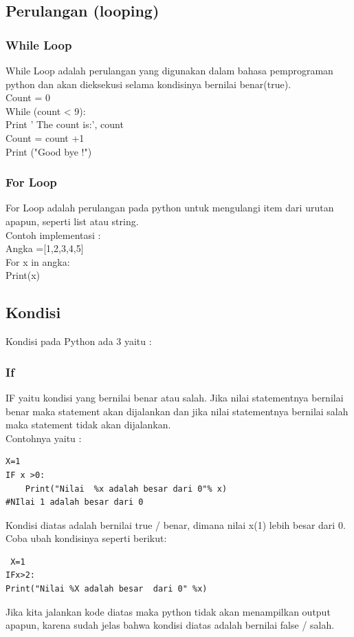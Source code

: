 \documentclass[12pt, times new roman, a4paper]{article}
\begin{document}
\subsection{Perulangan (looping)}
\subsubsection{ While Loop}
While Loop adalah perulangan yang digunakan dalam bahasa pemprograman python dan akan dieksekusi selama kondisinya bernilai benar(true).\\
Count = 0\\
While (count < 9):\\
Print ’ The count is:’, count\\
Count = count +1\\
Print ("Good bye !")\\
\subsubsection{For Loop}
For Loop adalah perulangan pada python untuk mengulangi item dari
urutan apapun, seperti list atau string.\\
Contoh implementasi :\\
Angka =[1,2,3,4,5]\\
For x in angka:\\
Print(x)\\

\subsection{Kondisi}
Kondisi pada Python ada 3 yaitu :\\
\subsubsection{If}
IF yaitu kondisi yang bernilai benar atau salah. Jika nilai statementnya
bernilai benar maka statement akan dijalankan dan jika nilai statementnya
bernilai salah maka statement tidak akan dijalankan.\\
Contohnya yaitu :
\begin{verbatim}
X=1
IF x >0:
	Print("Nilai  %x adalah besar dari 0"% x)
#NIlai 1 adalah besar dari 0
\end{verbatim}
Kondisi diatas adalah bernilai true / benar, dimana nilai x(1) lebih besar
dari 0. Coba ubah kondisinya seperti berikut:
\begin{verbatim}
 X=1
IFx>2:
Print("Nilai %X adalah besar  dari 0" %x)
\end{verbatim}
Jika kita jalankan kode diatas maka python tidak akan menampilkan output apapun, karena sudah jelas bahwa kondisi diatas adalah bernilai false
/ salah.\\
\end{document}
